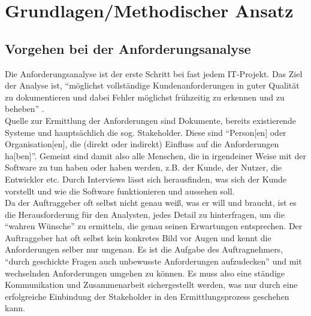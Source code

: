\documentclass [12pt, a4paper, oneside, titlepage, ngerman]{article}
\begin{document}
\newpage

\section {Grundlagen/Methodischer Ansatz}
\subsection{Vorgehen bei der Anforderungsanalyse}
Die Anforderungsanalyse ist der erste Schritt bei fast jedem IT-Projekt. Das Ziel der Analyse ist, "`möglichst vollständige Kundenanforderungen in guter Qualität zu dokumentieren und dabei Fehler möglichst frühzeitig zu erkennen und zu beheben"' \cite[S.11]{PohlRupp2015}. \\
Quelle zur Ermittlung der Anforderungen sind Dokumente, bereits existierende Systeme und hauptsächlich die sog. Stakeholder. Diese sind "`Person[en] oder Organisation[en], die (direkt oder indirekt) Einfluss auf die Anforderungen ha[ben]"'\cite[S.21]{PohlRupp2015}. Gemeint sind damit also alle Menschen, die in irgendeiner Weise mit der Software zu tun haben oder haben werden, z.B. der Kunde, der Nutzer, die Entwickler etc. Durch Interviews lässt sich herausfinden, was sich der Kunde vorstellt und wie die Software funktionieren und aussehen soll. \\
Da der Auftraggeber oft selbst nicht genau weiß, was er will und braucht, ist es die Herausforderung für den Analysten, jedes Detail zu hinterfragen, um die "`wahren Wünsche"' zu ermitteln, die genau seinen Erwartungen entsprechen. 
Der Auftraggeber hat oft selbst kein konkretes Bild vor Augen und kennt die Anforderungen selber nur ungenau. Es ist die Aufgabe des Auftragnehmers, "`durch geschickte Fragen auch unbewusste Anforderungen aufzudecken"'\cite[S.28]{PohlRupp2015} und mit wechselnden Anforderungen umgehen zu können.
Es muss also eine ständige Kommunikation und Zusammenarbeit sichergestellt werden, was nur durch eine erfolgreiche Einbindung der Stakeholder in den Ermittlungsprozess geschehen kann\cite[vgl. S. 33-34]{PohlRupp2015}.
\end{document}
